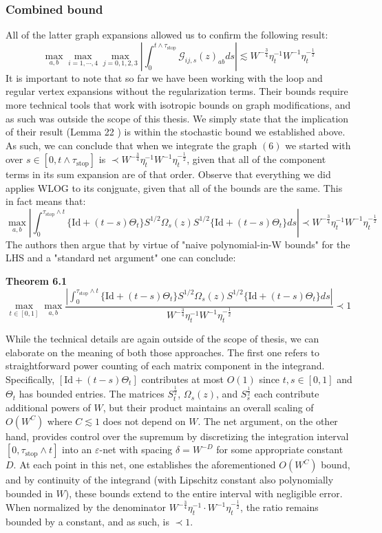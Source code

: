 \documentclass[11pt]{article}
\newenvironment{boxtheorem}[1]
  {\begin{mdframed}\noindent\textbf{#1}\itshape\space}
  {\end{mdframed}}
\newcommand{\sto}{\text{stop}}
\begin{document}
\subsubsection*{Combined bound}
All of the latter graph expansions allowed us to confirm the following result: $$\max_{a,b}\max_{i=1, \cdots, 4}\max_{j=0, 1, 2, 3} \left\vert \int_0^{t\wedge \tau_\sto}\mathcal{G}_{ij, s}(z)_{ab}ds\right\vert\lesssim W^{-\frac{3}{4}}\eta_t^{-1}W^{-1}\eta_t^{-\frac{1}{2}}$$
It is important to note that so far we have been working with the loop and regular vertex expansions without the regularization terms. Their bounds require more technical tools that work with isotropic bounds on graph modifications, and as such was outside the scope of this thesis. We simply state that the implication of their result (Lemma 22 \cite{bandSDE}) is within the stochastic bound we established above. As such, we can conclude that when we integrate the graph \hyperref[graph]{$(6)$} we started with over $s\in [0, t\wedge \tau_\sto]$ is $\prec W^{-\frac{3}{4}}\eta_t^{-1}W^{-1}\eta_t^{-\frac{1}{2}}$, given that all of the component terms in its sum expansion are of that order. Observe that everything we did applies WLOG to its conjguate, given that all of the bounds are the same. This in fact means that: $$\max_{a, b}\left\vert \int_0^{\tau_\sto\wedge t} \{\text{Id} + (t-s)\Theta_t\} S^{1/2}\Omega_s(z)S^{1/2} \{\text{Id} + (t-s)\Theta_t\}ds\right\vert \prec W^{-\frac{3}{4}}\eta_t^{-1}W^{-1}\eta_t^{-\frac{1}{2}}$$
The authors then argue that by virtue of "naive polynomial-in-W bounds" for the LHS and a "standard net argument" \cite{bandSDE} one can conclude:\begin{boxtheorem}{Theorem 6.1}
$$\max_{t\in [0, 1]}\max_{a, b}\frac{\left\vert \int_0^{\tau_\sto\wedge t} \{\text{Id} + (t-s)\Theta_t\} S^{1/2}\Omega_s(z)S^{1/2} \{\text{Id} + (t-s)\Theta_t\}ds\right\vert }{W^{-\frac{3}{4}}\eta_t^{-1}W^{-1}\eta_t^{-\frac{1}{2}}}\prec 1$$\end{boxtheorem}
While the technical details are again outside of the scope of thesis, we can elaborate on the meaning of both those approaches. The first one refers to straightforward power counting of each matrix component in the integrand. Specifically, $[\text{Id} + (t - s)\Theta_t]$ contributes at most $O(1)$ since $t,s \in [0,1]$ and $\Theta_t$ has bounded entries. The matrices $S_t^{\frac{1}{2}}$, $\Omega_s(z)$, and $S_s^{\frac{1}{2}}$ each contribute additional powers of $W$, but their product maintains an overall scaling of $O(W^C)$ where $C\lesssim 1$ does not depend on $W$. The net argument, on the other hand, provides control over the supremum by discretizing the integration interval $[0, \tau_{\text{stop}} \wedge t]$ into an $\varepsilon$-net with spacing $\delta = W^{-D}$ for some appropriate constant $D$. At each point in this net, one establishes the aforementioned $O(W^C)$ bound, and by continuity of the integrand (with Lipschitz constant also polynomially bounded in $W$), these bounds extend to the entire interval with negligible error. When normalized by the denominator $W^{-\frac{3}{4}}\eta_t^{-1} \cdot W^{-1}\eta_t^{-\frac{1}{2}}$, the ratio remains bounded by a constant, and as such, is $\prec 1$. 
\end{document}
